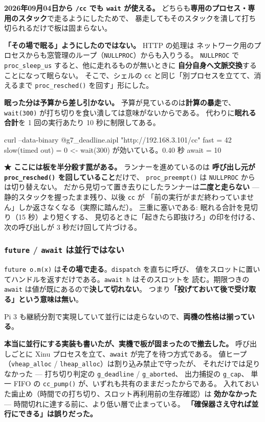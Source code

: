 \documentclass[11pt,a4paper]{ltjsarticle}
\begin{document}
\textbf{2026年09月04日から \texttt{/cc} でも \texttt{wait} が使える。}
どちらも\textbf{専用のプロセス・専用のスタック}で走るようにしたためで、
暴走してもそのスタックを潰して打ち切られるだけで板は固まらない。

\textbf{「その場で眠る」ようにしたのではない。} HTTP の処理は
ネットワーク用のプロセスからも窓管理のループ（\texttt{NULLPROC}）からも入りうる。
\texttt{NULLPROC} で \texttt{proc\_sleep\_us} すると、他に走れるものが無いときに
\textbf{自分自身へ文脈交換}することになって眠らない。
そこで、シェルの \texttt{cc} と同じ「別プロセスを立てて、消えるまで
\texttt{proc\_resched()} を回す」形にした。

\textbf{眠った分は予算から差し引かない。} 予算が見ているのは\textbf{計算の暴走}で、
\texttt{wait(300)} が打ち切りを食い潰しては意味がないからである。
代わりに\textbf{眠れる合計}を 1 回の実行あたり 10 秒に制限してある。

\begin{term}
curl --data-binary @g7_deadline.aipl "http://192.168.3.101/cc"
  fast = 42
  slow(timed out) = 0        <- wait(300) が効いている。0.40 秒
  await = 10
\end{term}

\textbf{★ ここには板を半分殺す罠がある。} ランナーを進めているのは
\textbf{呼び出し元が \texttt{proc\_resched()} を回していること}だけで、
\texttt{proc\_preempt()} は \texttt{NULLPROC} からは切り替えない。
だから見切って置き去りにしたランナーは\textbf{二度と走らない} ---
静的スタックを握ったまま残り、以後 \texttt{cc} が
「前の実行がまだ終わっていません」しか返さなくなる（実際に踏んだ）。
三重に塞いである: 眠れる合計を見切り（15 秒）より短くする、
見切るときに「起きたら即抜けろ」の印を付ける、
次の呼び出しが 3 秒だけ回して片づける。

\subsubsection*{\texttt{future} / \texttt{await} は並行ではない}
\label{sec:pi5-future}

\texttt{future o.m(x)} は\textbf{その場で走る}。\texttt{dispatch} を直ちに呼び、
値をスロットに置いてハンドルを返すだけである。\texttt{await h} はそのスロットを
読む。期限つきの \texttt{await} は値が既にあるので\textbf{決して切れない}。
つまり\textbf{「投げておいて後で受け取る」という意味は無い}。

Pi 3 も継続分割で実現していて並行には走らないので、\textbf{両機の性格は揃っている}。

\textbf{本当に並行にする実装も書いたが、実機で板が固まったので撤去した。}
呼び出しごとに Xinu プロセスを立て、\texttt{await} が完了を待つ方式である。
値ヒープ（\texttt{vheap\_alloc} / \texttt{lheap\_alloc}）は割り込み禁止で守ったが、
それだけでは足りなかった ---
打ち切り判定の \texttt{g\_deadline} / \texttt{g\_aborted}、
出力捕捉の \texttt{g\_cap}、
単一 FIFO の \texttt{cc\_pump()} が、いずれも共有のままだったからである。
入れておいた歯止め（時間での打ち切り、スロット再利用前の生存確認）は
\textbf{効かなかった} --- 時間切れに達する前に、より低い層で止まっている。
\textbf{「確保器さえ守れば並行にできる」は誤りだった。}
\end{document}
